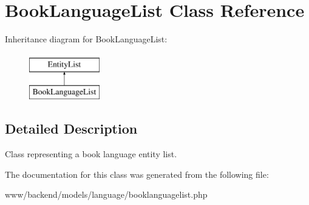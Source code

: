 \hypertarget{classBookLanguageList}{
\section{BookLanguageList Class Reference}
\label{classBookLanguageList}
}
Inheritance diagram for BookLanguageList:\begin{figure}[H]
\begin{center}
\leavevmode
\includegraphics[height=2.000000cm]{classBookLanguageList}
\end{center}
\end{figure}


\subsection{Detailed Description}
Class representing a book language entity list. 

The documentation for this class was generated from the following file:\begin{DoxyCompactItemize}
\item 
www/backend/models/language/booklanguagelist.php\end{DoxyCompactItemize}
